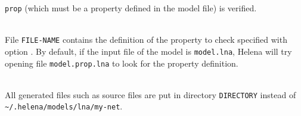 \begin{description}
\begin{itemize}
    \texttt{prop} (which must be a property defined in the model file)
    is verified.
  \end{itemize}
\item{}\\
  File \texttt{FILE-NAME} contains the definition of the property to
  check specified with option .  By
  default, if the input file of the model is \texttt{model.lna},
  Helena will try opening file \texttt{model.prop.lna} to look for the
  property definition.
\item{}\\
  All generated files such as source files are put in directory
  \texttt{DIRECTORY} instead of
  \texttt{\~{}/.helena/models/lna/my-net}.
\end{description}

